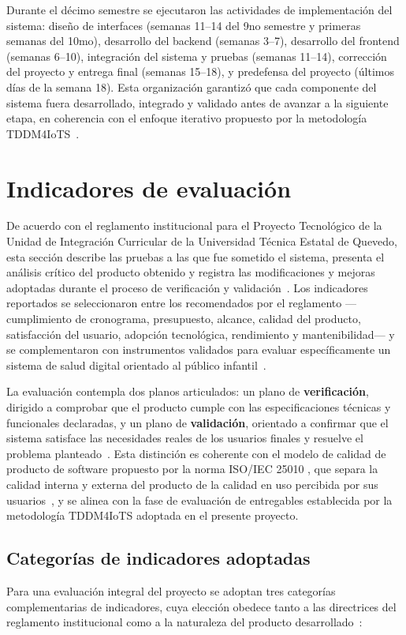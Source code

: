 			Durante el décimo semestre se ejecutaron las actividades de implementación del sistema: diseño de interfaces (semanas 11--14 del 9no semestre y primeras semanas del 10mo), desarrollo del backend (semanas 3--7), desarrollo del frontend (semanas 6--10), integración del sistema y pruebas (semanas 11--14), corrección del proyecto y entrega final (semanas 15--18), y predefensa del proyecto (últimos días de la semana 18). Esta organización garantizó que cada componente del sistema fuera desarrollado, integrado y validado antes de avanzar a la siguiente etapa, en coherencia con el enfoque iterativo propuesto por la metodología TDDM4IoTS~\cite{GuerreroUlloa2024,Fowler2002}.
		
		
		\section{Indicadores de evaluación}
			De acuerdo con el reglamento institucional para el Proyecto Tecnológico de la Unidad de Integración Curricular de la Universidad Técnica Estatal de Quevedo, esta sección describe las pruebas a las que fue sometido el sistema, presenta el análisis crítico del producto obtenido y registra las modificaciones y mejoras adoptadas durante el proceso de verificación y validación~\cite{GuerreroUlloa2024}. Los indicadores reportados se seleccionaron entre los recomendados por el reglamento ---cumplimiento de cronograma, presupuesto, alcance, calidad del producto, satisfacción del usuario, adopción tecnológica, rendimiento y mantenibilidad--- y se complementaron con instrumentos validados para evaluar específicamente un sistema de salud digital orientado al público infantil~\cite{Bangor2009,Venkatesh2003}.
			
			La evaluación contempla dos planos articulados: un plano de \textbf{verificación}, dirigido a comprobar que el producto cumple con las especificaciones técnicas y funcionales declaradas, y un plano de \textbf{validación}, orientado a confirmar que el sistema satisface las necesidades reales de los usuarios finales y resuelve el problema planteado~\cite{GuerreroUlloa2024}. Esta distinción es coherente con el modelo de calidad de producto de software propuesto por la norma ISO/IEC 25010 \cite{ISO25010}, que separa la calidad interna y externa del producto de la calidad en uso percibida por sus usuarios~\cite{GuerreroUlloa2024}, y se alinea con la fase de evaluación de entregables establecida por la metodología TDDM4IoTS adoptada en el presente proyecto.
			
			\subsection{Categorías de indicadores adoptadas}
				Para una evaluación integral del proyecto se adoptan tres categorías complementarias de indicadores, cuya elección obedece tanto a las directrices del reglamento institucional como a la naturaleza del producto desarrollado~\cite{GuerreroUlloa2024,Fowler2002}:
				
